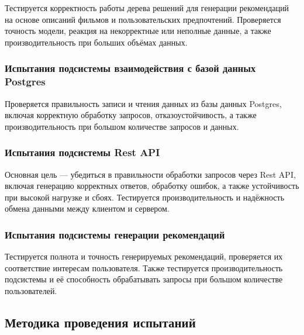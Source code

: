 Тестируется корректность работы дерева решений для генерации рекомендаций на основе описаний фильмов и пользовательских предпочтений. Проверяется точность модели, реакция на некорректные или неполные данные, а также производительность при больших объёмах данных.

\subsubsection{Испытания подсистемы взаимодействия с базой данных Postgres}

Проверяется правильность записи и чтения данных из базы данных Postgres, включая корректную обработку запросов, отказоустойчивость, а также производительность при большом количестве запросов и данных.

\subsubsection{Испытания подсистемы Rest API}

Основная цель — убедиться в правильности обработки запросов через Rest API, включая генерацию корректных ответов, обработку ошибок, а также устойчивость при высокой нагрузке и сбоях. Тестируется производительность и надёжность обмена данными между клиентом и сервером.

\subsubsection{Испытания подсистемы генерации рекомендаций}

Тестируется полнота и точность генерируемых рекомендаций, проверяется их соответствие интересам пользователя. Также тестируется производительность подсистемы и её способность обрабатывать запросы при большом количестве пользователей.

\subsection{Методика проведения испытаний}

